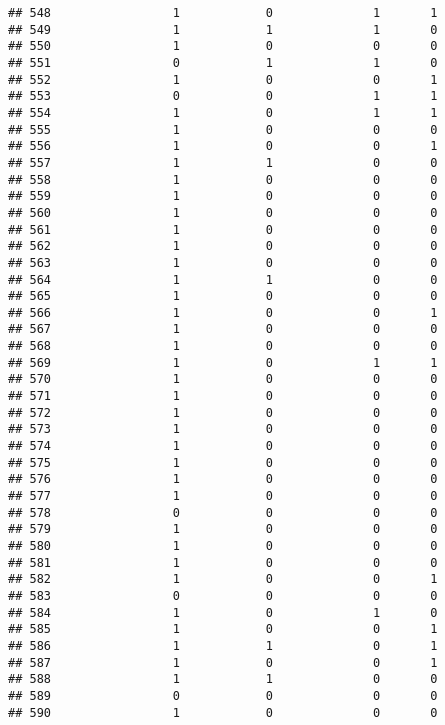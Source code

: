 \documentclass[]{article}
\begin{document}
\begin{verbatim}
## 548                 1            0              1       1
## 549                 1            1              1       0
## 550                 1            0              0       0
## 551                 0            1              1       0
## 552                 1            0              0       1
## 553                 0            0              1       1
## 554                 1            0              1       1
## 555                 1            0              0       0
## 556                 1            0              0       1
## 557                 1            1              0       0
## 558                 1            0              0       0
## 559                 1            0              0       0
## 560                 1            0              0       0
## 561                 1            0              0       0
## 562                 1            0              0       0
## 563                 1            0              0       0
## 564                 1            1              0       0
## 565                 1            0              0       0
## 566                 1            0              0       1
## 567                 1            0              0       0
## 568                 1            0              0       0
## 569                 1            0              1       1
## 570                 1            0              0       0
## 571                 1            0              0       0
## 572                 1            0              0       0
## 573                 1            0              0       0
## 574                 1            0              0       0
## 575                 1            0              0       0
## 576                 1            0              0       0
## 577                 1            0              0       0
## 578                 0            0              0       0
## 579                 1            0              0       0
## 580                 1            0              0       0
## 581                 1            0              0       0
## 582                 1            0              0       1
## 583                 0            0              0       0
## 584                 1            0              1       0
## 585                 1            0              0       1
## 586                 1            1              0       1
## 587                 1            0              0       1
## 588                 1            1              0       0
## 589                 0            0              0       0
## 590                 1            0              0       0

\end{verbatim}
\end{document}

